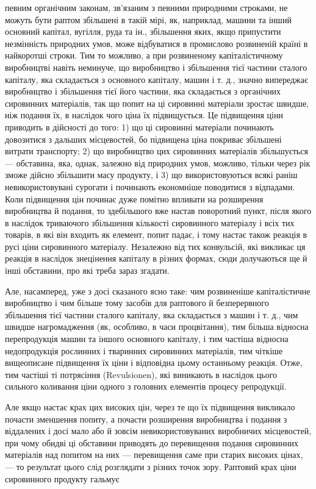 \parcont{}  %
певним органічним законам, зв’язаним з певними природними
строками, не можуть бути раптом збільшені в такій мірі, як,
наприклад, машини та інший основний капітал, вугілля, руда
та ін., збільшення яких, якщо припустити незмінність природних
умов, може відбуватися в промислово розвиненій країні
в найкоротші строки. Тим то можливо, а при розвиненому капіталістичному
виробництві навіть неминуче, що виробництво і
збільшення тієї частини сталого капіталу, яка складається з
основного капіталу, машин і т. д., значно випереджає виробництво
і збільшення тієї його частини, яка складається з органічних
сировинних матеріалів, так що попит на ці сировинні матеріали
зростає швидше, ніж подання їх, в наслідок чого ціна їх підвищується.
Це підвищення ціни приводить в дійсності до того:
1) що ці сировинні матеріали починають довозитися з дальших
місцевостей, бо підвищена ціна покриває збільшені витрати транспорту;
2) що виробництво цих сировинних матеріалів збільшується
— обставина, яка, однак, залежно від природних умов,
можливо, тільки через рік зможе дійсно збільшити масу продукту,
і 3) що використовуються всякі раніш невикористовувані
сурогати і починають економніше поводитися з відпадами. Коли
підвищення цін починає дуже помітно впливати на розширення
виробництва й подання, то здебільшого вже настав поворотний
пункт, після якого в наслідок триваючого збільшення кількості
сировинного матеріалу і всіх тих товарів, в які він входить як
елемент, попит падає, і тому настає також реакція в русі ціни
сировинного матеріалу. Незалежно від тих конвульсій, які викликає
ця реакція в наслідок знецінення капіталу в різних формах,
сюди долучаються ще й інші обставини, про які треба
зараз згадати.

Але, насамперед, уже з досі сказаного ясно таке: чим розвиненіше
капіталістичне виробництво і чим більше тому засобів
для раптового й безперервного збільшення тієї частини
сталого капіталу, яка складається з машин і т. д., чим швидше нагромадження
(як, особливо, в часи процвітання), тим більша відносна
перепродукція машин та іншого основного капіталу, і тим
частіша відносна недопродукція рослинних і тваринних сировинних
матеріалів, тим чіткіше вищеописане підвищення їх ціни і відповідна
цьому останньому реакція. Отже, тим частіші ті потрясіння
(Revulsionen), які виникають в наслідок цього сильного коливання
ціни одного з головних елементів процесу репродукції.

Але якщо настає крах цих високих цін, через те що їх підвищення
викликало почасти зменшення попиту, а почасти розширення
виробництва і подання з віддалених і досі мало або
й зовсім невикористовуваних виробничих місцевостей, при чому
обидві ці обставини приводять до перевищення подання сировинних
матеріалів над попитом на них — перевищення саме при старих
високих цінах, — то результат цього слід розглядати з різних
точок зору. Раптовий крах ціни сировинного продукту гальмує
\parbreak{}  %
